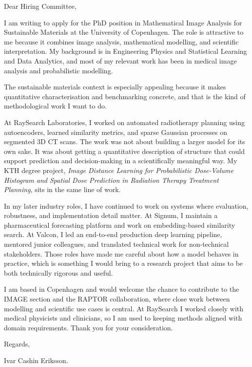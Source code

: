 \documentclass[11pt,a4paper]{moderncv}
\begin{document}
\makecvtitle
Dear Hiring Committee,

\vspace*{2em}
I am writing to apply for the PhD position in Mathematical Image Analysis for Sustainable Materials at the University of Copenhagen. The role is attractive to me because it combines image analysis, mathematical modelling, and scientific interpretation. My background is in Engineering Physics and Statistical Learning and Data Analytics, and most of my relevant work has been in medical image analysis and probabilistic modelling.

\hspace*{2em}
The sustainable materials context is especially appealing because it makes quantitative characterisation and benchmarking concrete, and that is the kind of methodological work I want to do.

\hspace*{2em}
At RaySearch Laboratories, I worked on automated radiotherapy planning using autoencoders, learned similarity metrics, and sparse Gaussian processes on segmented 3D CT scans. The work was not about building a larger model for its own sake. It was about getting a quantitative description of structure that could support prediction and decision-making in a scientifically meaningful way. My KTH degree project, \emph{Image Distance Learning for Probabilistic Dose-Volume Histogram and Spatial Dose Prediction in Radiation Therapy Treatment Planning}, sits in the same line of work.

\hspace*{2em}
In my later industry roles, I have continued to work on systems where evaluation, robustness, and implementation detail matter. At Signum, I maintain a pharmaceutical forecasting platform and work on embedding-based similarity search. At Valcon, I led an end-to-end production deep learning pipeline, mentored junior colleagues, and translated technical work for non-technical stakeholders. Those roles have made me careful about how a model behaves in practice, which is something I would bring to a research project that aims to be both technically rigorous and useful.

\hspace*{2em}
I am based in Copenhagen and would welcome the chance to contribute to the IMAGE section and the RAPTOR collaboration, where close work between modelling and scientific use cases is central. At RaySearch I worked closely with medical physicists and clinicians, so I am used to keeping methods aligned with domain requirements. Thank you for your consideration.

\vspace*{2em}
Regards,

\vspace*{1em}
Ivar Cashin Eriksson.
\end{document}
